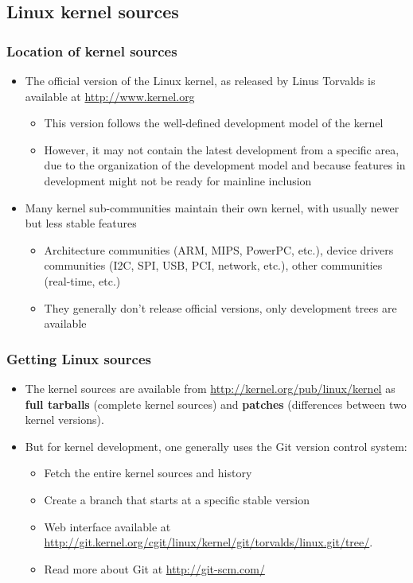 \subsection{Linux kernel sources}

\begin{frame}
  \frametitle{Location of kernel sources}
  \begin{itemize}
  \item The official version of the Linux kernel, as released by Linus
    Torvalds is available at \url{http://www.kernel.org}
    \begin{itemize}
    \item This version follows the well-defined development model of
      the kernel
    \item However, it may not contain the latest development from a
      specific area, due to the organization of the development model
      and because features in development might not be ready for
      mainline inclusion
    \end{itemize}
  \item Many kernel sub-communities maintain their own kernel, with
    usually newer but less stable features
    \begin{itemize}
    \item Architecture communities (ARM, MIPS, PowerPC, etc.), device
      drivers communities (I2C, SPI, USB, PCI, network, etc.), other
      communities (real-time, etc.)
    \item They generally don't release official versions, only
      development trees are available
    \end{itemize}
  \end{itemize}
\end{frame}

\begin{frame}
  \frametitle{Getting Linux sources}
  \begin{itemize}

  \item The kernel sources are available from
    \url{http://kernel.org/pub/linux/kernel} as {\bf full tarballs}
    (complete kernel sources) and {\bf patches} (differences between
    two kernel versions).
  \item But for kernel development, one generally uses the Git version
    control system:
    \begin{itemize}
    \item Fetch the entire kernel sources and history\\
    \item Create a branch that starts at a specific stable version\\
    \item Web interface available at
      \url{http://git.kernel.org/cgit/linux/kernel/git/torvalds/linux.git/tree/}.
    \item Read more about Git at \url{http://git-scm.com/}
    \end{itemize}
  \end{itemize}
\end{frame}

